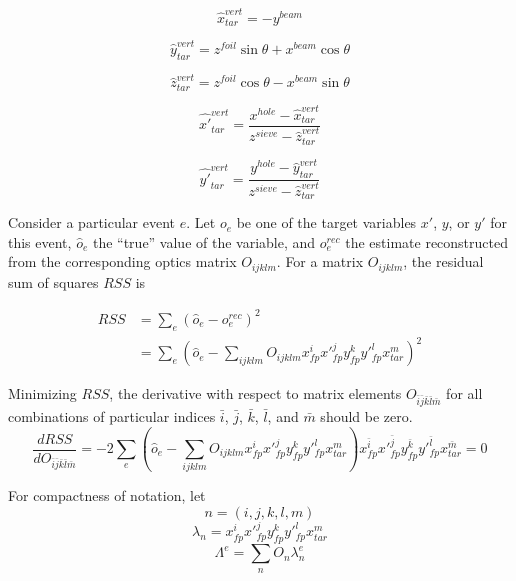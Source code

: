 \begin{equation}
    \hat{x}_{tar}^{vert} = -y^{beam}
\end{equation}

\begin{equation}
    \hat{y}_{tar}^{vert} = z^{foil}\sin\theta + x^{beam} \cos\theta
\end{equation}

\begin{equation}
    \hat{z}_{tar}^{vert} = z^{foil}\cos\theta - x^{beam} \sin\theta
\end{equation}

\begin{equation}
    \hat{x'}_{tar}^{vert} = \frac{x^{hole}-\hat{x}_{tar}^{vert}}
                                 {z^{sieve}-\hat{z}_{tar}^{vert}}
\end{equation}

\begin{equation}
    \hat{y'}_{tar}^{vert} = \frac{y^{hole}-\hat{y}_{tar}^{vert}}
                                 {z^{sieve}-\hat{z}_{tar}^{vert}}
\end{equation}

Consider a particular event $e$.
Let $o_e$ be one of the target variables $x'$, $y$, or $y'$ for this event,
$\hat{o}_e$ the ``true'' value of the variable,
and
$o^{rec}_e$ the estimate reconstructed
from the corresponding optics matrix $O_{ijklm}$.
For a matrix $O_{ijklm}$, the residual sum of squares $RSS$ is

\begin{align}
    RSS &= \sum_e (\hat{o}_e - o^{rec}_e)^2 \\
           &= \sum_e \left( \hat{o}_e - \sum_{ijklm} O_{ijklm} x^i_{fp} x'^j_{fp} y^k_{fp} y'^l_{fp} x^m_{tar} \right)^2
\end{align}


Minimizing $RSS$, the derivative with respect to matrix elements
$O_{\bar{i}\bar{j}\bar{k}\bar{l}\bar{m}}$
for all combinations of particular indices
$\bar{i}$, $\bar{j}$, $\bar{k}$, $\bar{l}$, and $\bar{m}$
should be zero.
\begin{equation}
    \frac{dRSS}{dO_{\bar{i}\bar{j}\bar{k}\bar{l}\bar{m}}}
    = -2 \sum_e \left( \hat{o}_e - \sum_{ijklm} O_{ijklm} x^i_{fp} x'^j_{fp} y^k_{fp} y'^l_{fp} x^m_{tar} \right)
      x^{\bar{i}}_{fp} x'^{\bar{j}}_{fp} y^{\bar{k}}_{fp} y'^{\bar{l}}_{fp} x^{\bar{m}}_{tar}
    = 0
\end{equation}

For compactness of notation, let
\begin{equation} \label{eqn:index_abbreviation}
    n = (i,j,k,l,m)
\end{equation}
\begin{equation}
    \lambda_n = x^{i}_{fp} x'^{j}_{fp} y^{k}_{fp} y'^{l}_{fp} x^{m}_{tar}
\end{equation}
\begin{equation}
    \Lambda^e = \sum_n O_n \lambda^e_n
\end{equation}


